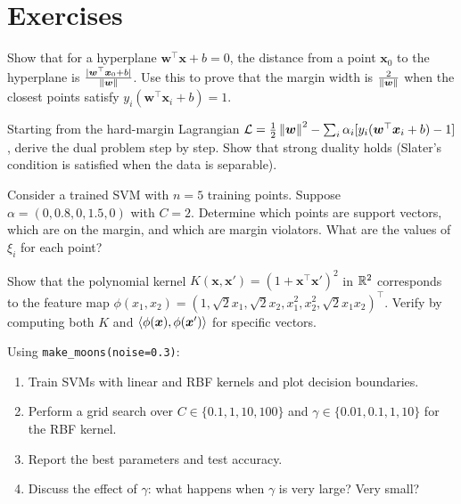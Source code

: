 \section{Exercises}

\begin{exercise}
Show that for a hyperplane $\bm{w}^\top\bm{x}+b=0$, the distance from a point $\bm{x}_0$ to the hyperplane is $\frac{|\bm{w}^\top\bm{x}_0+b|}{\left\| \bm{w} \right\|}$. Use this to prove that the margin width is $\frac{2}{\left\| \bm{w} \right\|}$ when the closest points satisfy $y_i(\bm{w}^\top\bm{x}_i+b)=1$.
\end{exercise}

\begin{exercise}
Starting from the hard-margin Lagrangian
$\mathcal{L} = \frac{1}{2}\left\| \bm{w} \right\|^2 - \sum_i \alpha_i[y_i(\bm{w}^\top\bm{x}_i+b)-1]$,
derive the dual problem step by step. Show that strong duality holds (Slater's condition is satisfied when the data is separable).
\end{exercise}

\begin{exercise}
Consider a trained SVM with $n=5$ training points. Suppose $\alpha = (0, 0.8, 0, 1.5, 0)$ with $C=2$. Determine which points are support vectors, which are on the margin, and which are margin violators. What are the values of $\xi_i$ for each point?
\end{exercise}

\begin{exercise}
Show that the polynomial kernel $K(\bm{x},\bm{x}') = (1+\bm{x}^\top\bm{x}')^2$ in $\mathbb{R}^2$ corresponds to the feature map $\phi(x_1,x_2) = (1, \sqrt{2}x_1, \sqrt{2}x_2, x_1^2, x_2^2, \sqrt{2}x_1 x_2)^\top$. Verify by computing both $K$ and $\langle \phi(\bm{x}), \phi(\bm{x}') \rangle$ for specific vectors.
\end{exercise}

\begin{exercise}
Using \texttt{make\_moons(noise=0.3)}:
\begin{enumerate}
    \item Train SVMs with linear and RBF kernels and plot decision boundaries.
    \item Perform a grid search over $C \in \{0.1,1,10,100\}$ and $\gamma \in \{0.01,0.1,1,10\}$ for the RBF kernel.
    \item Report the best parameters and test accuracy.
    \item Discuss the effect of $\gamma$: what happens when $\gamma$ is very large? Very small?
\end{enumerate}
\end{exercise}

